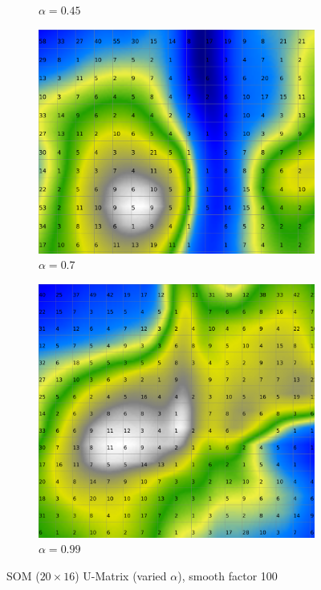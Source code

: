 \documentclass{acm_proc_article-sp}
\begin{document}
\begin{figure}
\begin{subfigure}[b]{0.24\linewidth}
        \caption{$\alpha=0.45$}
        \label{fig:wine-20x16-smoothed-data-histogram-alpha-0,45-f-100}
    \end{subfigure}
    \begin{subfigure}[b]{0.24\linewidth}
        \includegraphics[width=\linewidth]{img/wine-20x16-smoothed-data-histogram-alpha-0,7-f-100}
        \caption{$\alpha=0.7$}
        \label{fig:wine-20x16-smoothed-data-histogram-alpha-0,7-f-100}
    \end{subfigure}
    \begin{subfigure}[b]{0.24\linewidth}
        \includegraphics[width=\linewidth]{img/wine-20x16-smoothed-data-histogram-alpha-0,99-f-100}
        \caption{$\alpha=0.99$}
        \label{fig:wine-20x16-smoothed-data-histogram-alpha-0,99-f-100}
    \end{subfigure}
    \caption{SOM ($20\times16$) U-Matrix (varied $\alpha$), smooth factor 100}
    \label{fig:wine-20x16-smoothed-data-histogram-alpha-f-100}
\end{figure}
\end{document}
